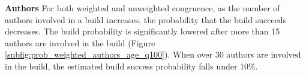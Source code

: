 \indent\indent
\textbf{Authors} For both weighted and unweighted congruence, as the number of authors involved in a build increases, the probability that the build succeeds decreases. The build probability is significantly lowered after more than 15 authors are involved in the build (Figure \ref{subfig:prob_weighted_authors_age_q100}). When over 30 authors are involved in the build, the estimated build success probability falls under 10\%.

\begin{figure}[b]
\centering
{}


\end{figure}
